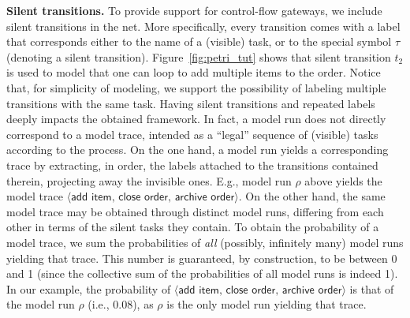 \noindent
\textbf{Silent transitions.} To provide support for control-flow gateways, we include silent transitions in the net. More specifically, every transition comes with a label that corresponds either to the name of a (visible) task, or to the special symbol $\tau$ (denoting a silent transition). Figure~\ref{fig:petri_tut} shows that silent transition $t_2$ is used to model that one can loop to add multiple items to the order. Notice that, for simplicity of modeling, we support the possibility of labeling multiple transitions with the same task. Having silent transitions and repeated labels deeply impacts the obtained framework. In fact, a model run does not directly correspond to a model trace, intended as a ``legal'' sequence of (visible) tasks according to the process. On the one hand, a model run yields a corresponding trace by extracting, in order, the labels attached to the transitions contained therein, projecting away the invisible ones. E.g., model run $\rho$ above yields the model trace $\langle \textsf{add item},\,\textsf{close order},\,\textsf{archive order}\rangle$. On the other hand, the same model trace may be obtained through distinct model runs, differing from each other in terms of the silent tasks they contain. To obtain the probability of a model trace, we sum  the probabilities of \emph{all} (possibly, infinitely many) model runs yielding that trace. This number is guaranteed, by construction, to be between 0 and 1 (since the collective sum of the probabilities of all model runs is indeed 1). In our example, the probability of $\langle \textsf{add item},\,\textsf{close order},\,\textsf{archive order}\rangle$ is that of the model run $\rho$ (i.e., $0.08$), as $\rho$ is the only model run yielding that trace.




